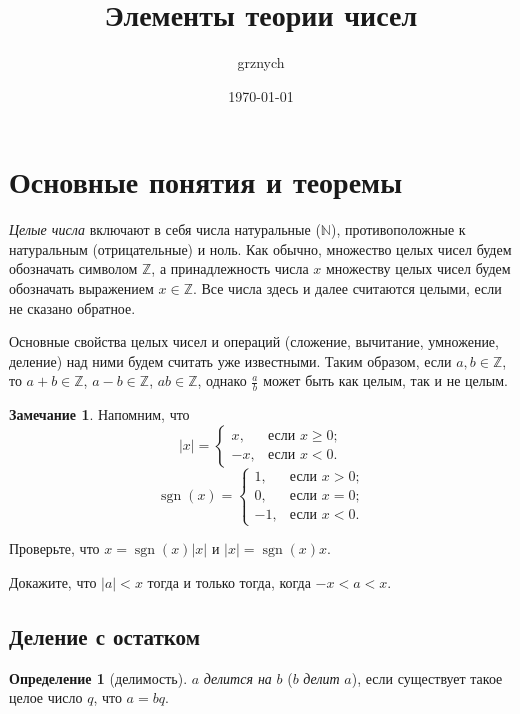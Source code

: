\documentclass[14pt, a4paper]{extarticle}
\title{Элементы теории чисел}
\author{grznych}
\date{\today}
\theoremstyle{definition}
\newtheorem*{definition}{Определение}
\newtheorem*{remark}{Замечание}
\DeclareMathOperator{\sgn}{sgn}
\begin{document}
	
\maketitle
\tableofcontents
	
\newpage
\section{Основные понятия и теоремы}
\label{section:osn}
	
	\emph{Целые числа} включают в себя числа натуральные ($\mathbb{N}$), противоположные к натуральным (отрицательные) и ноль. Как обычно, множество целых чисел будем обозначать символом $\mathbb{Z}$, а принадлежность числа $x$ множеству целых чисел будем обозначать выражением $x\in\mathbb{Z}$. Все числа здесь и далее считаются целыми, если не сказано обратное.
	
	Основные свойства целых чисел и операций (сложение, вычитание, умножение, деление) над ними будем считать уже известными. Таким образом, если $a,b\in\mathbb{Z}$, то $a+b\in\mathbb{Z}$, $a-b\in\mathbb{Z}$, $ab\in\mathbb{Z}$, однако $\frac{a}{b}$ может быть как целым, так и не целым.

	\begin{remark}
		Напомним, что $$|x|=
		\begin{cases}
			x,&\text{если $x\geqslant0$;}\\
			-x,&\text{если $x<0$.}
		\end{cases}$$
		$$\sgn(x)=
		\begin{cases}
			1,&\text{если $x>0$;}\\
			0,&\text{если $x=0$;}\\
			-1,&\text{если $x<0$.}
		\end{cases}$$

		Проверьте, что $x=\sgn(x)|x|$ и $|x|=\sgn(x)x$.
		
		Докажите, что $|a|<x$ тогда и только тогда, когда $-x<a<x$.
	\end{remark}

\subsection{Деление с остатком}
\label{subsection:del}
	
	\begin{definition}[делимость]
		$a$ \emph{делится на} $b$ ($b$ \emph{делит} $a$), если существует такое целое число $q$, что $a=bq$.
	\end{definition}
\end{document}
